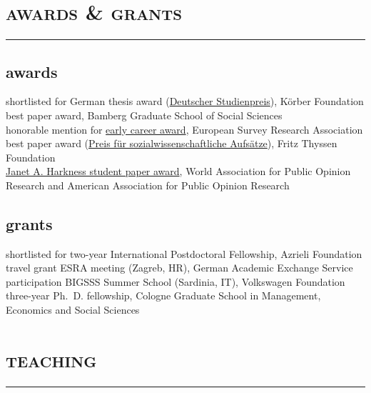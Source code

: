 \documentclass[11pt, a4paper]{article}
\begin{document}
\section*{\textsc{awards \& grants}}
\vskip-20pt{\noindent\rule{\textwidth}{1pt}}
\subsection*{awards}
shortlisted for German thesis award (\href{https://www.koerber-stiftung.de/fileadmin/user_upload/koerber-stiftung/redaktion/deutscher-studienpreis/pdf/2019/2019_Nominierte_SozialWissenschaften.pdf}{Deutscher Studienpreis}), Körber Foundation\\
best paper award, Bamberg Graduate School of Social Sciences\\
honorable mention for \href{https://www.europeansurveyresearch.org/awards/prize}{early career award}, European Survey Research Association\\
best paper award (\href{https://www.fritz-thyssen-stiftung.de/cms/wp-content/uploads/2018/06/Jahresbericht_2017_interaktiv.pdf}{Preis für sozialwissenschaftliche Aufsätze}), Fritz Thyssen Foundation\\
\href{https://wapor.org/events/annual-conference/awards-funds/janet-a-harkness-student-paper-award/}{Janet A. Harkness student paper award}, World Association for Public Opinion Research and American Association for Public Opinion Research\\
\subsection*{grants}
shortlisted for two-year International Postdoctoral Fellowship, Azrieli Foundation\\
travel grant ESRA meeting (Zagreb, HR), German Academic Exchange Service\\
participation BIGSSS Summer School (Sardinia, IT), Volkswagen Foundation\\
three-year Ph.~D. fellowship, Cologne Graduate School in Management, Economics and Social Sciences
\newpage
\section*{\textsc{teaching}}
\vskip-20pt{\noindent\rule{\textwidth}{1pt}}
\noindent
\end{document}
